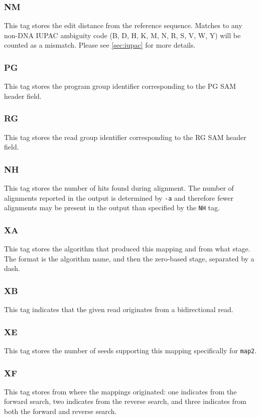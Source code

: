 \documentclass[a4paper,12pt]{book}
\newcommand{\TT}[1]{{\tt #1}} %
\begin{document}
\subsubsection{NM}
This tag stores the edit distance from the reference sequence.
Matches to any non-DNA IUPAC ambiguity code (B, D, H, K, M, N, R, S, V, W, Y) will be counted as a mismatch.
Please see \autoref{sec:iupac} for more details. 

\subsubsection{PG}
This tag stores the program group identifier corresponding to the PG SAM header field.

\subsubsection{RG}
This tag stores the read group identifier corresponding to the RG SAM header field.

\subsubsection{NH}
This tag stores the number of hits found during alignment.
The number of alignments reported in the output is determined by \TT{-a} and therefore fewer alignments may be present in the output than specified by the \TT{NH} tag.

\subsubsection{XA}
This tag stores the algorithm that produced this mapping and from what stage.
The format is the algorithm name, and then the zero-based stage, separated by a dash.

\subsubsection{XB}
This tag indicates that the given read originates from a bidirectional read.

\subsubsection{XE}
This tag stores the number of seeds supporting this mapping specifically for \TT{map2}.

\subsubsection{XF}
This tag stores from where the mappings originated: one indicates from the forward search, two indicates from the reverse search, and three indicates from both the forward and reverse search.
\end{document}

